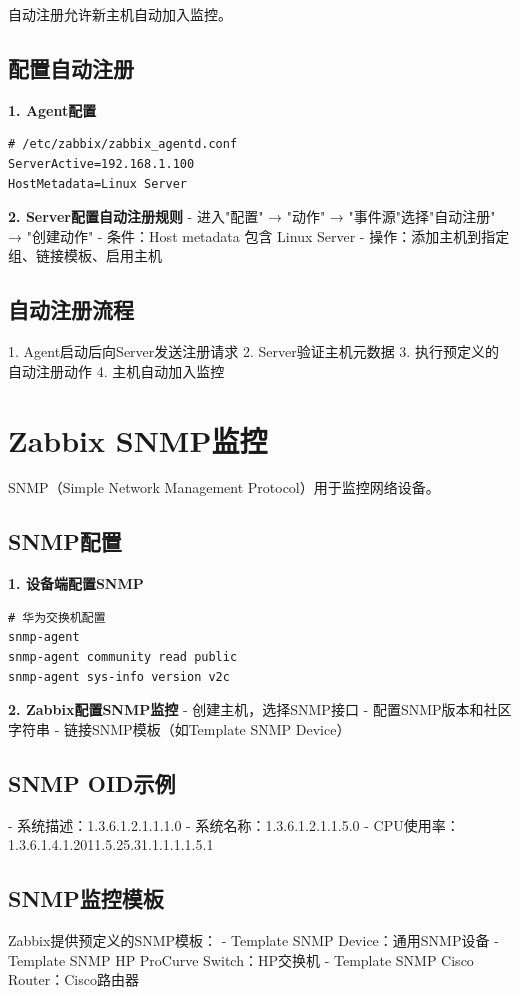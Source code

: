 \documentclass[12pt,UTF8]{ctexbook}
\begin{document}
自动注册允许新主机自动加入监控。

\subsection*{配置自动注册}

\textbf{1. Agent配置}
\begin{lstlisting}
# /etc/zabbix/zabbix_agentd.conf
ServerActive=192.168.1.100
HostMetadata=Linux Server
\end{lstlisting}

\textbf{2. Server配置自动注册规则}
- 进入"配置" → "动作" → "事件源"选择"自动注册" → "创建动作"
- 条件：Host metadata 包含 Linux Server
- 操作：添加主机到指定组、链接模板、启用主机

\subsection*{自动注册流程}
1. Agent启动后向Server发送注册请求
2. Server验证主机元数据
3. 执行预定义的自动注册动作
4. 主机自动加入监控

\section{Zabbix SNMP监控}
\label{sec:zabbix-snmp}

SNMP（Simple Network Management Protocol）用于监控网络设备。

\subsection*{SNMP配置}

\textbf{1. 设备端配置SNMP}
\begin{lstlisting}
# 华为交换机配置
snmp-agent
snmp-agent community read public
snmp-agent sys-info version v2c
\end{lstlisting}

\textbf{2. Zabbix配置SNMP监控}
- 创建主机，选择SNMP接口
- 配置SNMP版本和社区字符串
- 链接SNMP模板（如Template SNMP Device）

\subsection*{SNMP OID示例}
- 系统描述：1.3.6.1.2.1.1.1.0
- 系统名称：1.3.6.1.2.1.1.5.0
- CPU使用率：1.3.6.1.4.1.2011.5.25.31.1.1.1.1.5.1

\subsection*{SNMP监控模板}
Zabbix提供预定义的SNMP模板：
- Template SNMP Device：通用SNMP设备
- Template SNMP HP ProCurve Switch：HP交换机
- Template SNMP Cisco Router：Cisco路由器
\end{document}
